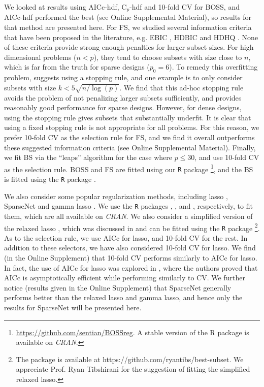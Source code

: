 We looked at results using AICc-hdf, C$_p$-hdf and 10-fold CV for BOSS, and AICc-hdf performed the best (see Online Supplemental Material), so results for that method are presented here. For FS, we studied several information criteria that have been proposed in the literature, e.g. EBIC \citep{wang2009forward}, HDBIC and HDHQ \citep{ing2011stepwise}. None of these criteria provide strong enough penalties for larger subset sizes. For high dimensional problems ($n<p$), they tend to choose subsets with size close to $n$, which is far from the truth for sparse designs ($p_0=6$). To remedy this overfitting problem, \citet{ing2011stepwise} suggests using a stopping rule, and one example is to only consider subsets with size $k < 5\sqrt{n / \log(p)}$. We find that this ad-hoc stopping rule avoids the problem of not penalizing larger subsets sufficiently, and provides reasonably good performance for sparse designs. However, for dense designs, using the stopping rule gives subsets that substantially underfit. It is clear that using a fixed stopping rule is not appropriate for all problems. For this reason, we prefer 10-fold CV as the selection rule for FS, and we find it overall outperforms these suggested information criteria (see Online Supplemental Material). Finally, we fit BS via the ``leaps'' algorithm for the case where $p \le 30$, and use 10-fold CV as the selection rule. BOSS and FS are fitted using our {\tt{R}} package \footnote{\url{https://github.com/sentian/BOSSreg}. A stable version of the R package is available on \textit{CRAN}.}, and the BS is fitted using the {\tt{R}} package  \citep{FortrancodebyAlanMiller2020}.

We also consider some popular regularization methods, including lasso \citep{Tibshirani1996}, SparseNet \citep{Mazumder2011} and gamma lasso \citep{Taddy2017}. We use the {\tt{R}} packages  \citep{Friedman2010},  \citep{Mazumder2011}, and  \citep{Taddy2017}, respectively, to fit them, which are all available on \textit{CRAN}. We also consider a simplified version of the relaxed lasso \citep{Meinshausen2007}, which was discussed in \citet{Hastie2017} and can be fitted using the {\tt{R}} package \footnote{The package is available at https://github.com/ryantibs/best-subset. We appreciate Prof. Ryan Tibshirani for the suggestion of fitting the simplified relaxed lasso.}. As to the selection rule, we use AICc for lasso, and 10-fold CV for the rest. In addition to these selectors, we have also considered 10-fold CV for lasso. We find (in the Online Supplement) that 10-fold CV performs similarly to AICc for lasso. In fact, the use of AICc for lasso was explored in \citet{Flynn2013}, where the authors proved that AICc is asymptotically efficient while performing similarly to CV. We further notice (results given in the Online Supplement) that SparseNet generally performs better than the relaxed lasso and gamma lasso, and hence only the results for SparseNet will be presented here. 


